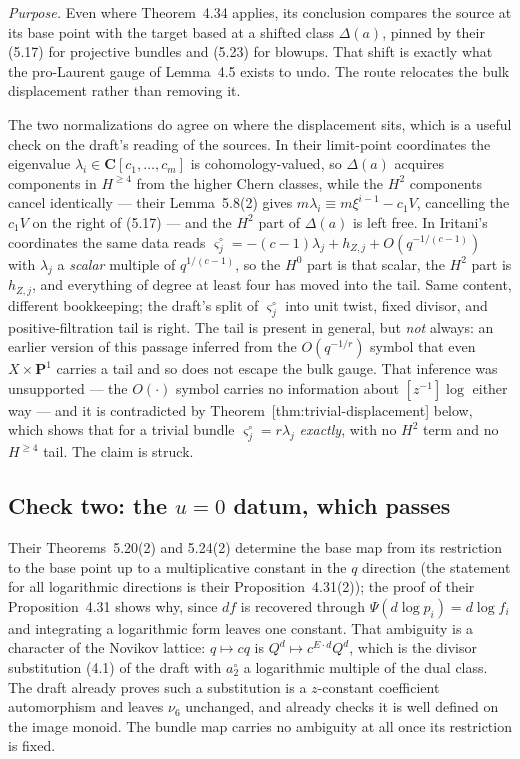 \documentclass[11pt]{article}
\theoremstyle{definition}
\theoremstyle{remark}
\newcommand{\C}{\mathbf C}
\newcommand{\PP}{\mathbf P}
\begin{document}
\emph{Purpose.} Even where Theorem~4.34 applies, its conclusion compares the
source at its base point with the target based at a shifted class $\Delta(a)$,
pinned by their (5.17) for projective bundles and (5.23) for blowups. That
shift is exactly what the pro-Laurent gauge of Lemma~4.5 exists to undo. The
route relocates the bulk displacement rather than removing it.

The two normalizations do agree on where the displacement sits, which is a
useful check on the draft's reading of the sources. In their limit-point
coordinates the eigenvalue $\lambda_i\in\C[c_1,\dots,c_m]$ is cohomology-valued,
so $\Delta(a)$ acquires components in $H^{\ge4}$ from the higher Chern classes,
while the $H^2$ components cancel identically --- their Lemma~5.8(2) gives
$m\lambda_i\equiv m\xi^{i-1}-c_1V$, cancelling the $c_1V$ on the right of
(5.17) --- and the $H^2$ part of $\Delta(a)$ is left free. In Iritani's
coordinates the same data reads
$\varsigma_j^\circ=-(c-1)\lambda_j+h_{Z,j}+O(q^{-1/(c-1)})$ with $\lambda_j$ a
\emph{scalar} multiple of $q^{1/(c-1)}$, so the $H^0$ part is that scalar, the
$H^2$ part is $h_{Z,j}$, and everything of degree at least four has moved into
the tail. Same content, different bookkeeping; the draft's split of
$\varsigma_j^\circ$ into unit twist, fixed divisor, and positive-filtration tail
is right. The tail is present in general, but \emph{not} always: an earlier
version of this passage inferred from the $O(q^{-1/r})$ symbol that even
$X\times\PP^1$ carries a tail and so does not escape the bulk gauge. That
inference was unsupported --- the $O(\cdot)$ symbol carries no information about
$[z^{-1}]\log$ either way --- and it is contradicted by
Theorem~\textup{[thm:trivial-displacement]} below, which shows that for a trivial
bundle $\varsigma_j^\circ=r\lambda_j$ \emph{exactly}, with no $H^2$ term and no
$H^{\ge4}$ tail. The claim is struck.

\subsection*{Check two: the $u=0$ datum, which passes}

Their Theorems~5.20(2) and 5.24(2) determine the base map from its restriction
to the base point up to a multiplicative constant in the $q$ direction (the
statement for all logarithmic directions is their Proposition~4.31(2));
the proof of their Proposition~4.31 shows why, since $df$ is recovered through
$\Psi(d\log p_i)=d\log f_i$ and integrating a logarithmic form leaves one
constant. That ambiguity is a character of the Novikov lattice: $q\mapsto cq$ is
$Q^d\mapsto c^{E\cdot d}Q^d$, which is the divisor substitution (4.1) of the
draft with $a_2^\circ$ a logarithmic multiple of the dual class. The draft
already proves such a substitution is a $z$-constant coefficient automorphism
and leaves $\nu_6$ unchanged, and already checks it is well defined on the image
monoid. The bundle map carries no ambiguity at all once its restriction is
fixed.
\end{document}

